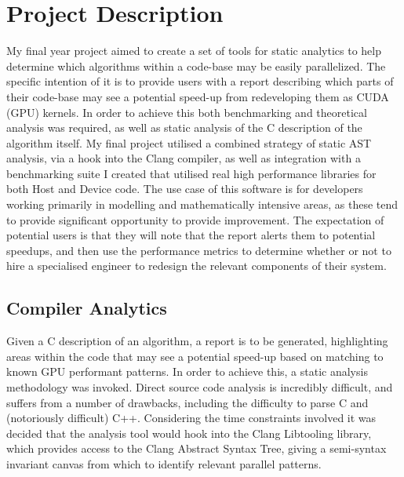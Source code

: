 
\section{Project Description} 
My final year project aimed to create a set of tools for static analytics to help determine which
algorithms within a code-base may be easily parallelized. The specific intention of it is to provide
users with a report describing which parts of their code-base may see a potential speed-up from
redeveloping them as CUDA (GPU)\cite{cuda} kernels. In order to achieve this both benchmarking and
theoretical analysis was required, as well as static analysis of the C description of the algorithm
itself. My final project utilised a combined strategy of static AST analysis, via a hook into the
Clang compiler, as well as integration with a benchmarking suite I created that utilised real high
performance libraries for both Host and Device code. The use case of this software is for developers
working primarily in modelling and mathematically intensive areas, as these tend to provide
significant opportunity to provide improvement. The expectation of potential users is that they will
note that the report alerts them to potential speedups, and then use the performance metrics to
determine whether or not to hire a specialised engineer to redesign the relevant components of their
system.

\subsection{Compiler Analytics} 
Given a C description of an algorithm, a report is to be generated, highlighting areas within the
code that may see a potential speed-up based on matching to known GPU performant patterns. In order
to achieve this, a static analysis methodology was invoked. Direct source code analysis is
incredibly difficult, and suffers from a number of drawbacks, including the difficulty to parse C
and (notoriously difficult) C++. Considering the time constraints involved it was decided that the
analysis tool would hook into the Clang Libtooling library, which provides access to the Clang
Abstract Syntax Tree, giving a semi-syntax invariant canvas from which to identify relevant parallel
patterns.

